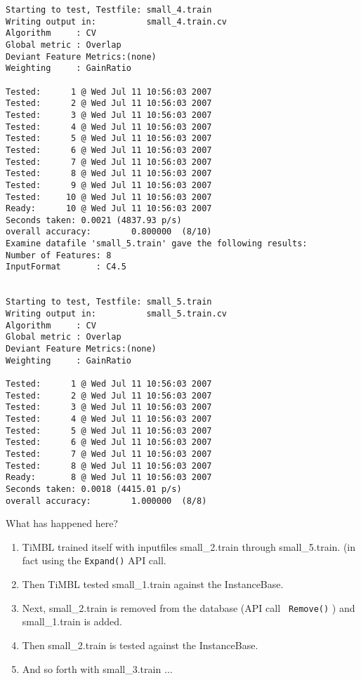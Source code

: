\documentclass{report}
\begin{document}
\begin{footnotesize}
\begin{verbatim}
Starting to test, Testfile: small_4.train
Writing output in:          small_4.train.cv
Algorithm     : CV
Global metric : Overlap
Deviant Feature Metrics:(none)
Weighting     : GainRatio

Tested:      1 @ Wed Jul 11 10:56:03 2007
Tested:      2 @ Wed Jul 11 10:56:03 2007
Tested:      3 @ Wed Jul 11 10:56:03 2007
Tested:      4 @ Wed Jul 11 10:56:03 2007
Tested:      5 @ Wed Jul 11 10:56:03 2007
Tested:      6 @ Wed Jul 11 10:56:03 2007
Tested:      7 @ Wed Jul 11 10:56:03 2007
Tested:      8 @ Wed Jul 11 10:56:03 2007
Tested:      9 @ Wed Jul 11 10:56:03 2007
Tested:     10 @ Wed Jul 11 10:56:03 2007
Ready:      10 @ Wed Jul 11 10:56:03 2007
Seconds taken: 0.0021 (4837.93 p/s)
overall accuracy:        0.800000  (8/10)
Examine datafile 'small_5.train' gave the following results:
Number of Features: 8
InputFormat       : C4.5


Starting to test, Testfile: small_5.train
Writing output in:          small_5.train.cv
Algorithm     : CV
Global metric : Overlap
Deviant Feature Metrics:(none)
Weighting     : GainRatio

Tested:      1 @ Wed Jul 11 10:56:03 2007
Tested:      2 @ Wed Jul 11 10:56:03 2007
Tested:      3 @ Wed Jul 11 10:56:03 2007
Tested:      4 @ Wed Jul 11 10:56:03 2007
Tested:      5 @ Wed Jul 11 10:56:03 2007
Tested:      6 @ Wed Jul 11 10:56:03 2007
Tested:      7 @ Wed Jul 11 10:56:03 2007
Tested:      8 @ Wed Jul 11 10:56:03 2007
Ready:       8 @ Wed Jul 11 10:56:03 2007
Seconds taken: 0.0018 (4415.01 p/s)
overall accuracy:        1.000000  (8/8)
\end{verbatim}
\end{footnotesize}


What has happened here?

\begin{enumerate}
\item TiMBL trained itself with inputfiles small\_2.train through
small\_5.train. (in fact using the {\tt Expand()} API call.
\item Then TiMBL tested small\_1.train against the InstanceBase.
\item Next, small\_2.train is removed from the database (API call {\tt
Remove()} ) and small\_1.train is added.
\item Then small\_2.train is tested against the InstanceBase.
\item And so forth with small\_3.train $\ldots$
\end{enumerate}
\clearpage
\end{document}
